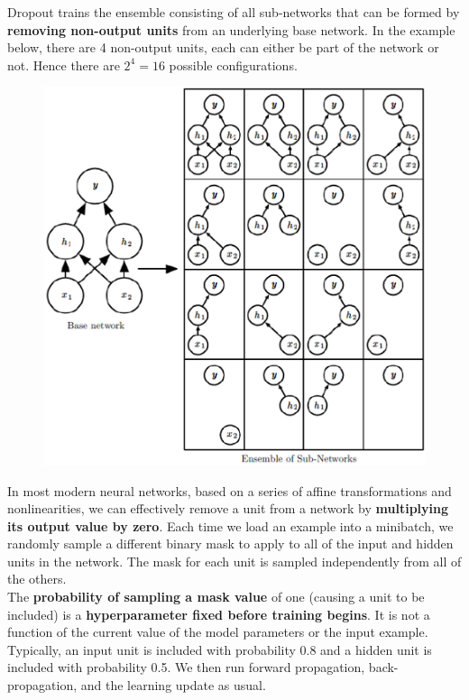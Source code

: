 \begin{multicols}{2}
	Dropout trains the ensemble consisting of all sub-networks that can be formed by \textbf{removing non-output units} from an underlying base network.
	In the example below, there are 4 non-output units, each can either be part of the network or not. Hence there are $2^4=16$ possible configurations.
	\begin{figure}[H]
		\centering
		\includegraphics[width=0.9\linewidth]{images/dropoutensemble.png}
	\end{figure}
	In most modern neural networks, based on a series of affine transformations and nonlinearities, we can effectively remove a unit from a network by \textbf{multiplying its output value by zero}.
	Each time we load an example into a minibatch, we randomly sample a different binary mask to apply to all of the input and hidden units in the network. The mask for each unit is sampled independently from all of the others.\\

	The \textbf{probability of sampling a mask value} of one (causing a unit to be included) is a \textbf{hyperparameter fixed before training begins}. It is not a function of the current value of the model parameters or the input example.
	Typically, an input unit is included with probability 0.8 and a hidden unit is included with probability 0.5. We then run forward propagation, back-propagation, and the learning update as usual.\\


\end{multicols}
